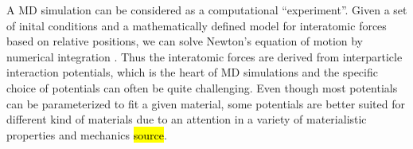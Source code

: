 A \acrshort{MD} simulation can be considered as a computational ``experiment''.
Given a set of inital conditions and a mathematically defined model for
interatomic forces based on relative positions, we can solve Newton's equation
of motion by numerical integration \cite[p. 303]{BHUSHAN20051507}. Thus the
interatomic forces are derived from interparticle interaction potentials, which
is the heart of \acrshort{MD} simulations and the specific choice of potentials
can often be quite challenging. Even though most potentials can be parameterized
to fit a given material, some potentials are better suited for different kind of
materials due to an attention in a variety of materialistic properties and
mechanics \hl{source}.
















